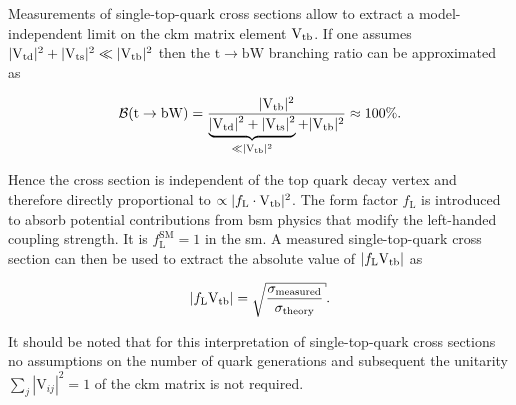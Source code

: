 
Measurements of single-top-quark cross sections allow to extract a model-independent limit on the \gls{ckm} matrix element ${\mathrm{V}_\mathrm{tb}}$. If one assumes $|{\mathrm{V}_\mathrm{td}}|^2+|{\mathrm{V}_\mathrm{ts}}|^2\ll|{\mathrm{V}_\mathrm{tb}}|^2$ then the $\mathrm{t}\to\mathrm{bW}$ branching ratio can be approximated as

\begin{equation}
\mathcal{B}(\mathrm{t}\to\mathrm{bW})=\frac{|{\mathrm{V}_\mathrm{tb}}|^2}{\underbrace{|{\mathrm{V}_\mathrm{td}}|^2+|{\mathrm{V}_\mathrm{ts}}|^2}_{\ll|{\mathrm{V}_\mathrm{tb}}|^2}+|{\mathrm{V}_\mathrm{tb}}|^2}\approx 100\%.
\end{equation}

Hence the cross section is independent of the top quark decay vertex and therefore directly proportional to $\propto|f_\mathrm{L}\cdot{\mathrm{V}_\mathrm{tb}}|^2$. The form factor $f_\mathrm{L}$ is introduced to absorb potential contributions from \gls{bsm} physics that modify the left-handed coupling strength. It is $f_\mathrm{L}^\mathrm{SM}=1$ in the \gls{sm}. A measured single-top-quark cross section can then be used to extract the absolute value of $|f_\mathrm{L}{\mathrm{V}_\mathrm{tb}}|$ as

\begin{equation}
|f_\mathrm{L}\vtb|=\sqrt{\frac{\sigma_\mathrm{measured}}{\sigma_\mathrm{theory}}}.
\end{equation}

It should be noted that for this interpretation of single-top-quark cross sections no assumptions on the number of quark generations and subsequent the unitarity $\sum_j|\mathrm{V}_{ij}|^2=1$ of the \gls{ckm} matrix is not required.




